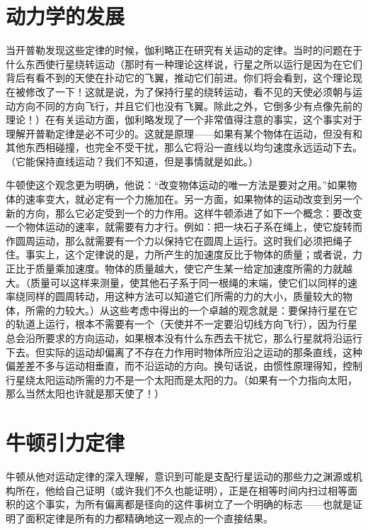 \section{动力学的发展}

当开普勒发现这些定律的时候，伽利略正在研究有关运动的定律。当时的问题在于什么东西使行星绕转运动（那时有一种理论这样说，行星之所以运行是因为在它们背后有看不到的天使在扑动它的飞翼，推动它们前进。你们将会看到，这个理论现在被修改了一下！这就是说，为了保持行星的绕转运动，看不见的天使必须朝与运动方向不同的方向飞行，并且它们也没有飞翼。除此之外，它倒多少有点像先前的理论！）在有关运动方面，伽利略发现了一个非常值得注意的事实，这个事实对于理解开普勒定律是必不可少的。这就是原理——如果有某个物体在运动，但没有和其他东西相碰撞，也完全不受干扰，那么它将沿一直线以均匀速度永远运动下去。（它能保持直线运动？我们不知道，但是事情就是如此。）

牛顿使这个观念更为明确，他说：“改变物体运动的唯一方法是要对之用。”如果物体的速率变大，就必定有一个力施加在。另一方面，如果物体的运动改变到另一个新的方向，那么它必定受到一个的力作用。这样牛顿添进了如下一个概念：要改变一个物体运动的速率，就需要有力才行。例如：把一块石子系在绳上，使它旋转而作圆周运动，那么就需要有一个力以保持它在圆周上运行。这时我们必须把绳子住。事实上，这个定律说的是，力所产生的加速度反比于物体的质量；或者说，力正比于质量乘加速度。物体的质量越大，使它产生某一给定加速度所需的力就越大。（质量可以这样来测量，使其他石子系于同一根绳的末端，使它们以同样的速率绕同样的圆周转动，用这种方法可以知道它们所需的力的大小，质量较大的物体，所需的力较大。）从这些考虑中得出的一个卓越的观念就是：要保持行星在它的轨道上运行，根本不需要有一个（天使并不一定要沿切线方向飞行），因为行星总会沿所要求的方向运动，如果根本没有什么东西去干扰它，那么行星就将沿运行下去。但实际的运动却偏离了不存在力作用时物体所应沿之运动的那条直线，这种偏差差不多与运动相垂直，而不沿运动的方向。换句话说，由惯性原理得知，控制行星绕太阳运动所需的力不是一个太阳而是太阳的力。（如果有一个力指向太阳，那么当然太阳也许就是那天使了！）


\section{牛顿引力定律}

牛顿从他对运动定律的深入理解，意识到可能是支配行星运动的那些力之渊源或机构所在，他给自己证明（或许我们不久也能证明），正是在相等时间内扫过相等面积的这个事实，为所有偏离都是径向的这件事树立了一个明确的标志——也就是证明了面积定律是所有的力都精确地这一观点的一个直接结果。

